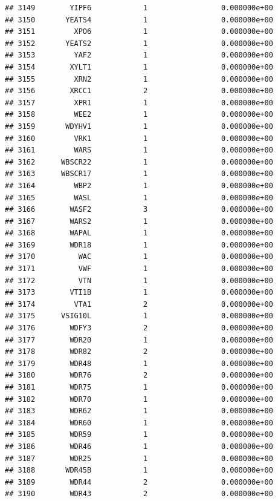 \documentclass[
]{article}
\begin{document}
\begin{verbatim}
## 3149        YIPF6            1                 0.000000e+00
## 3150       YEATS4            1                 0.000000e+00
## 3151         XPO6            1                 0.000000e+00
## 3152       YEATS2            1                 0.000000e+00
## 3153         YAF2            1                 0.000000e+00
## 3154        XYLT1            1                 0.000000e+00
## 3155         XRN2            1                 0.000000e+00
## 3156        XRCC1            2                 0.000000e+00
## 3157         XPR1            1                 0.000000e+00
## 3158         WEE2            1                 0.000000e+00
## 3159       WDYHV1            1                 0.000000e+00
## 3160         VRK1            1                 0.000000e+00
## 3161         WARS            1                 0.000000e+00
## 3162      WBSCR22            1                 0.000000e+00
## 3163      WBSCR17            1                 0.000000e+00
## 3164         WBP2            1                 0.000000e+00
## 3165         WASL            1                 0.000000e+00
## 3166        WASF2            3                 0.000000e+00
## 3167        WARS2            1                 0.000000e+00
## 3168        WAPAL            1                 0.000000e+00
## 3169        WDR18            1                 0.000000e+00
## 3170          WAC            1                 0.000000e+00
## 3171          VWF            1                 0.000000e+00
## 3172          VTN            1                 0.000000e+00
## 3173        VTI1B            1                 0.000000e+00
## 3174         VTA1            2                 0.000000e+00
## 3175      VSIG10L            1                 0.000000e+00
## 3176        WDFY3            2                 0.000000e+00
## 3177        WDR20            1                 0.000000e+00
## 3178        WDR82            2                 0.000000e+00
## 3179        WDR48            1                 0.000000e+00
## 3180        WDR76            2                 0.000000e+00
## 3181        WDR75            1                 0.000000e+00
## 3182        WDR70            1                 0.000000e+00
## 3183        WDR62            1                 0.000000e+00
## 3184        WDR60            1                 0.000000e+00
## 3185        WDR59            1                 0.000000e+00
## 3186        WDR46            1                 0.000000e+00
## 3187        WDR25            1                 0.000000e+00
## 3188       WDR45B            1                 0.000000e+00
## 3189        WDR44            2                 0.000000e+00
## 3190        WDR43            2                 0.000000e+00

\end{verbatim}
\end{document}
